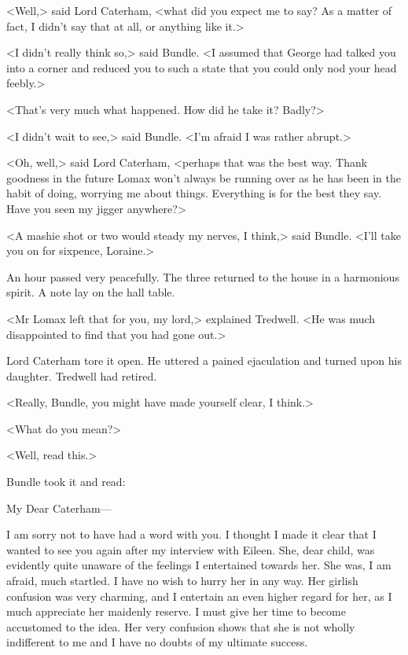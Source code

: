 <Well,> said Lord Caterham, <what did you expect me to say? As a matter of fact, I didn't say that at all, or anything like it.>

<I didn't really think so,> said Bundle. <I assumed that George had talked you into a corner and reduced you to such a state that you could only nod your head feebly.>

<That's very much what happened. How did he take it? Badly?>

<I didn't wait to see,> said Bundle. <I'm afraid I was rather abrupt.>

<Oh, well,> said Lord Caterham, <perhaps that was the best way. Thank goodness in the future Lomax won't always be running over as he has been in the habit of doing, worrying me about things. Everything is for the best they say. Have you seen my jigger anywhere?>

<A mashie shot or two would steady my nerves, I think,> said Bundle. <I'll take you on for sixpence, Loraine.>

An hour passed very peacefully. The three returned to the house in a harmonious spirit. A note lay on the hall table.

<Mr Lomax left that for you, my lord,> explained Tredwell. <He was much disappointed to find that you had gone out.>

Lord Caterham tore it open. He uttered a pained ejaculation and turned upon his daughter. Tredwell had retired.

<Really, Bundle, you might have made yourself clear, I think.>

<What do you mean?>

<Well, read this.>

Bundle took it and read:

\begin{mail}{}{My Dear Caterham—}

I am sorry not to have had a word with you. I thought I made it clear that I wanted to see you again after my interview with Eileen. She, dear child, was evidently quite unaware of the feelings I entertained towards her. She was, I am afraid, much startled. I have no wish to hurry her in any way. Her girlish confusion was very charming, and I entertain an even higher regard for her, as I much appreciate her maidenly reserve. I must give her time to become accustomed to the idea. Her very confusion shows that she is not wholly indifferent to me and I have no doubts of my ultimate success.

\end{mail}

